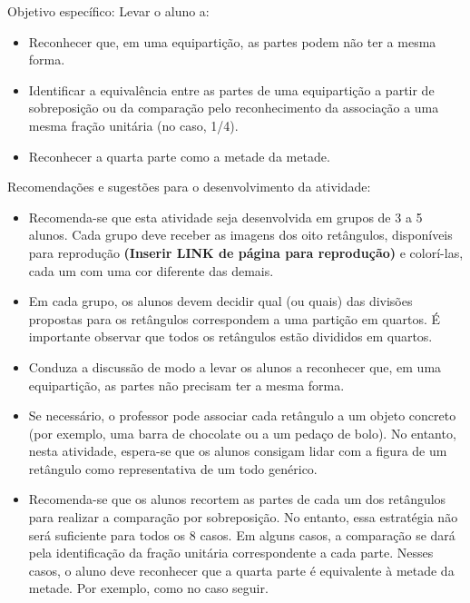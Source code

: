 \documentclass[a4paper,12pt,twoside]{book}
\begin{document}
\begin{professor*}[breakable]{}{}     
  Objetivo específico: Levar o aluno a:  
\begin{itemize} %
    \item       Reconhecer que, em uma equipartição, as partes podem não ter a mesma forma. 
    \item       Identificar a equivalência entre as partes de uma equipartição a partir de sobreposição ou da comparação pelo reconhecimento da associação a uma mesma fração unitária (no caso, 1/4).
    \item       Reconhecer a quarta parte como a metade da metade.
\end{itemize} %
  
  
  Recomendações e sugestões para o desenvolvimento da atividade:  
  
\begin{itemize} %
    \item       Recomenda-se que esta atividade seja desenvolvida em grupos de 3 a 5 alunos. Cada grupo deve receber as imagens dos oito retângulos, disponíveis para reprodução       {\bf (Inserir LINK de página para reprodução)}       e colorí-las, cada um com uma cor diferente das demais.
    \item       Em cada grupo, os alunos devem decidir qual (ou quais) das divisões propostas para os retângulos correspondem a uma partição em quartos. É importante observar que todos os retângulos estão divididos em quartos.
    \item       Conduza a discussão de modo a levar os alunos a reconhecer que, em uma equipartição, as partes não precisam ter a mesma forma.   
    \item       Se necessário, o professor pode associar cada retângulo a um objeto concreto (por exemplo, uma barra de chocolate ou a um pedaço de bolo). No entanto, nesta atividade, espera-se que os alunos consigam lidar com a figura de um retângulo como representativa de um todo genérico. 
    \item       Recomenda-se que os alunos recortem as partes de cada um dos retângulos para realizar a comparação por sobreposição. No entanto, essa estratégia não será suficiente para todos os 8 casos. Em alguns casos, a comparação se dará pela identificação da fração unitária correspondente a cada parte. Nesses casos, o aluno deve reconhecer que a quarta parte é equivalente à metade da metade. Por exemplo, como no caso seguir.
\end{itemize} %
  

\end{professor*}
\end{document}
